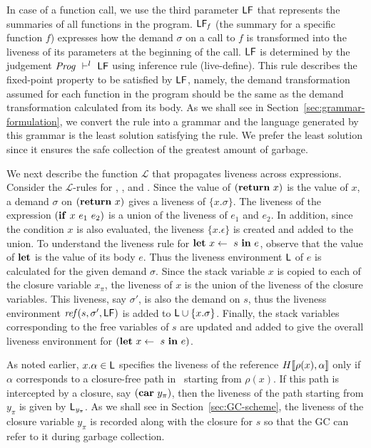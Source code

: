 \documentclass[9pt,preprint,letter,nonatbib]{sigplanconf}
\newcommand{\added}[1]{#1}
\begin{document}
In case of a  function call, we  use the third  parameter $\mathsf{LF}$
that  represents  the  summaries  of all  functions  in  the  program.
$\mathsf{LF}_{\mathit  f}$  (the summary for a  specific
function $f$) expresses  how the demand $\sigma$ on a  call to $f$ is
transformed into  the liveness of  its parameters at the  beginning of
the  call.  $\mathsf{LF}$  is determined  by the  judgement $\mathit{Prog}
\ \vdash^l\   \mathsf{LF}$ using  inference rule  ({\sc live-define}).   This rule
describes  the  fixed-point property  to  be  satisfied by  $\mathsf{LF}$,
namely, the  demand transformation  assumed for  each function  in the
program should  be the  same as  the demand  transformation calculated
from      its      body.       As       we      shall      see      in
Section~\ref{sec:grammar-formulation},  we  convert  the rule  into  a
grammar and  the language generated  by this grammar is  the least
solution satisfying  the rule. We  prefer the least solution  since it
ensures the safe collection of the greatest amount of garbage.

We next  describe the function $\mathcal{L}$  that propagates liveness
across  expressions.   Consider  the $\mathcal{L}$-rules  for  {\LET},
{\SIF}, and {\SRETURN}.  Since the value of $(\mbox{$\mathbf{ return}$}~x)$ is the
value  of  $x$,  a  demand $\sigma$  on  $(\mbox{$\mathbf{ return}$}~x)$  gives  a
liveness   of  $\{x.\sigma\}$.    The  liveness   of  the   expression
$(\mbox{$\mathbf{ if}$}~x~e_1~e_2)$  is  a union  of  the  liveness of  $e_1$  and
$e_2$. In  addition, since  the condition $x$  is also  evaluated, the
liveness $\{x.\epsilon\}$ is created and  added to the union.  
To  understand  the  liveness rule  for  $\mbox{$\mathbf{ let}$}~x  \leftarrow~s~\mbox{$\mathbf{ in}$}~e$,
observe that the value  of $\mbox{$\mathbf{ let}$}$ is the value of  its body $e$.  Thus
the  liveness environment  $\mathsf{L}$ of  $e$ is  calculated for  the given
demand $\sigma$. Since the stack variable $x$ is copied to each of the
closure variable  $x_{\pi}$, the liveness of  $x$ is the union  of the
liveness of the  closure variables.  This liveness,  say $\sigma'$, is
also  the  demand  on  $s$, thus the  liveness  environment
$\mathit{ref}(s,   \sigma',   \mathsf{LF})$   is  added   to   $\mathsf{L}   \cup
\{x.\sigma\}$. Finally, the stack variables corresponding to the free
variables of $s$ are updated and added 
  to  give the  overall liveness environment  for $(\mbox{$\mathbf{ let}$}~x
\leftarrow~s~\mbox{$\mathbf{ in}$}~e)$.

\added{  As noted  earlier, $x.\alpha  \in \mathsf{L}$  specifies the
  liveness of the reference $H\llbracket\rho(x), \alpha\rrbracket$
  only   if   $\alpha$  corresponds   to   a   closure-free  path   in
  \heap\ starting  from $\rho(x)$.  If  this path is intercepted  by a
  closure,  say  $(\mbox{$\mathbf{car}$}~{y_{\pi}})$, then  the  liveness  of the  path
  starting from $\mathit{y_{\pi}}$ is given by $\mathsf{L}_\mathit{y_{\pi}}$.
  As we shall see in  Section~\ref{sec:GC-scheme}, the liveness of the
  closure variable  $y_{\pi}$ is recorded  along with the  closure for
  $s$ so that the GC can refer to it during garbage collection.  }
\end{document}
